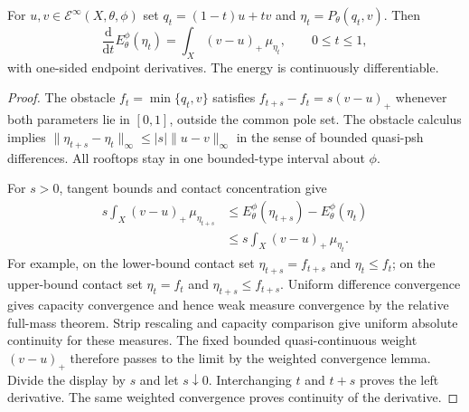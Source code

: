\begin{lemma}\label{lem:rooftop-affine-energy-derivative}
For $u,v\in\mathcal E^\infty(X,\theta,\phi)$ set $q_t=(1-t)u+tv$ and $\eta_t=P_\theta(q_t,v)$. Then
\[
 \frac{\mathrm d}{\mathrm dt}E_\theta^\phi(\eta_t)
                   =\int_X(v-u)_+\,\mu_{\eta_t},\qquad0\leq t\leq1,
\]
with one-sided endpoint derivatives. The energy is continuously differentiable.
\end{lemma}
\begin{proof}
The obstacle $f_t=\min\{q_t,v\}$ satisfies
$f_{t+s}-f_t=s(v-u)_+$ whenever both parameters lie in $[0,1]$, outside the common pole set. The obstacle calculus implies
$\|\eta_{t+s}-\eta_t\|_\infty\leq |s|\|u-v\|_\infty$ in the sense of bounded quasi-psh differences. All rooftops stay in one bounded-type interval about $\phi$.

For $s>0$, tangent bounds and contact concentration give
\[
 \begin{aligned}
 s\int_X(v-u)_+\,\mu_{\eta_{t+s}}
 &\leq E_\theta^\phi(\eta_{t+s})-E_\theta^\phi(\eta_t)\\
 &\leq s\int_X(v-u)_+\,\mu_{\eta_t}.
 \end{aligned}
\]
For example, on the lower-bound contact set $\eta_{t+s}=f_{t+s}$ and $\eta_t\leq f_t$; on the upper-bound contact set $\eta_t=f_t$ and $\eta_{t+s}\leq f_{t+s}$. Uniform difference convergence gives capacity convergence and hence weak measure convergence by the relative full-mass theorem. Strip rescaling and capacity comparison give uniform absolute continuity for these measures. The fixed bounded quasi-continuous weight $(v-u)_+$ therefore passes to the limit by the weighted convergence lemma. Divide the display by $s$ and let $s\downarrow0$. Interchanging $t$ and $t+s$ proves the left derivative. The same weighted convergence proves continuity of the derivative.
\end{proof}

